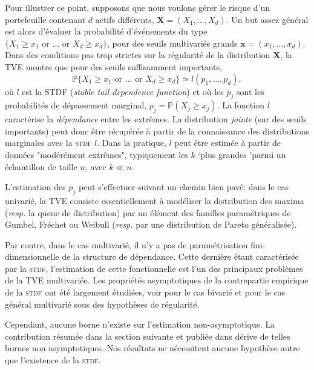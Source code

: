 \documentclass[a4paper, 12pt]{article}
\def\mb{\mathbf}
\def\P{\mathbb{P}}
\begin{document}
Pour illustrer ce point, supposons que nous voulons gérer le risque d'un portefeuille contenant $ d $ actifs différents, $ \mb X = (X_1, \ldots, X_d) $. Un but assez général est alors d'évaluer la probabilité d'événements du type
 $\{X_1 \ge x_1 \text{ or }  \dotsc \text{ or } X_d\ge x_d \}$, 
pour des seuils multivariés grands $\mb x=(x_1,\ldots,x_d)$. Dans des conditions pas trop strictes sur la régularité de la distribution $ \mb X $, la \textsc {TVE} montre que pour des seuils suffisamment importants,
\[
\P\{X_1 \ge x_1 \text{ or }  \dotsc \text{ or }
X_d\ge x_d \} \simeq 
l(p_1,\ldots,p_d), 
\] 
où $ l $ est la STDF (\emph{stable tail dependence function}) et où les $ p_j $  sont les probabilités de dépassement marginal, $ p_j = \P (X_j \ge x_j) $. La fonction $ l $ caractérise la \emph {dépendance} entre les extrêmes. La distribution \emph {jointe} (sur des seuils importants) peut donc être récupérée à partir de la connaissance des distributions marginales avec la \textsc {stdf} $ l $. Dans la pratique, $ l $ peut être estimée à partir de données "modérément extrêmes", typiquement les $ k $ `plus grandes 'parmi un échantillon de taille $ n $, avec $ k \ll n $.

L'estimation des $ p_j $ peut s'effectuer suivant un chemin bien pavé: dans le cas univarié, la \textsc {TVE} consiste essentiellement à modéliser la distribution des maxima (\emph {resp.} la queue de distribution) par un élément des familles paramétriques de Gumbel, Fréchet ou Weibull (\emph {resp.} par une distribution de Pareto généralisée).

Par contre, dans le cas multivarié, il n'y a pas de paramétrisation fini-dimensionnelle de la structure de dépendance.
Cette dernière étant caractérisée par la \textsc {stdf}, l'estimation de cette fonctionnelle est l'un des principaux problèmes de la \textsc {TVE} multivariée. Les propriétés asymptotiques de la contrepartie empirique de la \textsc {stdf} ont été largement étudiées, voir \cite {Huangphd, Drees98, Embrechts2000, dHF06} pour le cas bivarié et \cite {Qi97, Einmahl2012} pour le cas général multivarié sous des hypothèses de régularité.

Cependant, aucune borne n'existe sur l'estimation non-asymptotique. La contribution résumée dans la section suivante et publiée dans \cite{COLT15} dérive de telles bornes non asymptotiques. Nos résultats ne nécessitent aucune hypothèse autre que l'existence de la \textsc {stdf}.
\end{document}
